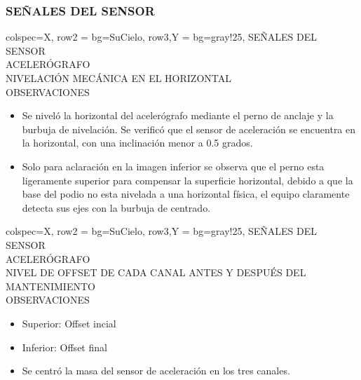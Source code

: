 \subsubsection{SEÑALES DEL SENSOR}
\begin{tblr}{
        colspec={X},
        row{2} = {bg=SuCielo},
        row{3,Y} = {bg=gray!25},
    } %
    SEÑALES DEL SENSOR \\
    ACELERÓGRAFO \MakeUppercase{} \\
    NIVELACIÓN MECÁNICA EN EL HORIZONTAL \\
    OBSERVACIONES \\
    \begin{itemize}
        \item Se niveló la horizontal del acelerógrafo mediante el perno de anclaje y la burbuja de nivelación. Se verificó que el sensor de aceleración se encuentra en la horizontal, con una inclinación menor a 0.5 grados.
        \item Solo para aclaración en la imagen inferior se observa que el perno esta ligeramente superior para compensar la superficie horizontal, debido a que la base del podio no esta nivelada a una horizontal física, el equipo claramente detecta sus ejes con la burbuja de centrado.
    \end{itemize}
\end{tblr}
% 
\newpage
\begin{tblr}{
        colspec={X},
        row{2} = {bg=SuCielo},
        row{3,Y} = {bg=gray!25},
    } %
    SEÑALES DEL SENSOR \\
    ACELERÓGRAFO \MakeUppercase{} \\
    NIVEL DE OFFSET DE CADA CANAL ANTES Y DESPUÉS DEL MANTENIMIENTO \\
    OBSERVACIONES \\
    \begin{itemize}
        \item Superior: Offset incial
        \item Inferior: Offset final
        \item Se centró la masa del sensor de aceleración en los tres canales.
    \end{itemize}
\end{tblr}
